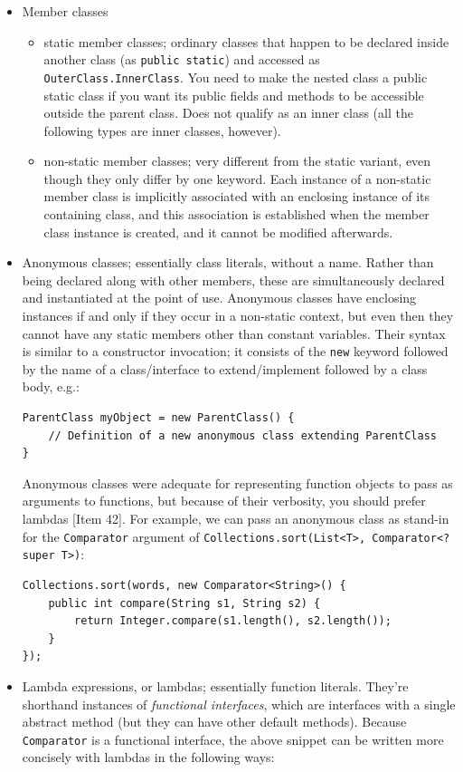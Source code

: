 \documentclass[table, xcdraw]{article}%
\begin{document}
\begin{itemize}
    \item Member classes
    \begin{itemize}
        \item static member classes; ordinary classes that happen to be declared inside another class (as \texttt{public static}) and accessed as \texttt{OuterClass.InnerClass}. You need to make the nested class a public static class if you want its public fields and methods to be accessible outside the parent class. Does not qualify as an inner class (all the following types are inner classes, however).
        \item non-static member classes; very different from the static variant, even though they only differ by one keyword. Each instance of a non-static member class is implicitly associated with an enclosing instance of its containing class, and this association is established when the member class instance is created, and it cannot be modified afterwards.
    \end{itemize}
    \item Anonymous classes; essentially class literals, without a name. Rather than being declared along with other members, these are simultaneously declared and instantiated at the point of use. Anonymous classes have enclosing instances if and only if they occur in a non-static context, but even then they cannot have any static members other than constant variables. Their syntax is similar to a constructor invocation; it consists of the \texttt{new} keyword followed by the name of a class/interface to extend/implement followed by a class body, e.g.:
    
    \begin{verbatim}
ParentClass myObject = new ParentClass() {
    // Definition of a new anonymous class extending ParentClass
}
    \end{verbatim}
    
    Anonymous classes were adequate for representing function objects to pass as arguments to functions, but because of their verbosity, you should prefer lambdas [Item 42]. For example, we can pass an anonymous class as stand-in for the \texttt{Comparator} argument of \texttt{Collections.sort(List<T>, Comparator<? super T>)}:

    \begin{verbatim}
Collections.sort(words, new Comparator<String>() {
    public int compare(String s1, String s2) {
        return Integer.compare(s1.length(), s2.length());
    }
});
    \end{verbatim}
    \item Lambda expressions, or lambdas; essentially function literals. They're shorthand instances of \emph{functional interfaces}, which are interfaces with a single abstract method (but they can have other default methods). Because \texttt{Comparator} is a functional interface, the above snippet can be written more concisely with lambdas in the following ways:
    

\end{itemize}
\end{document}
